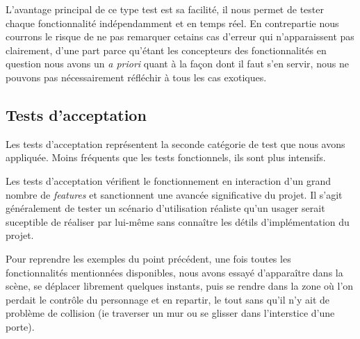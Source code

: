 L'avantage principal de ce type test est sa facilité, il nous permet de tester chaque fonctionnalité indépendamment et en temps réel. En contrepartie nous courrons le risque de ne pas remarquer cetains cas d'erreur qui n'apparaissent pas clairement, d'une part parce qu'étant les concepteurs des fonctionnalités en question nous avons un \textit{a priori} quant à la façon dont il faut s'en servir, nous ne pouvons pas nécessairement réfléchir à tous les cas exotiques.

\subsection{Tests d'acceptation}
Les tests d'acceptation représentent la seconde catégorie de test que nous avons appliquée. Moins fréquents que les tests fonctionnels, ils sont plus intensifs. \newline

Les tests d'acceptation vérifient le fonctionnement en interaction d'un grand nombre de \textit{features} et sanctionnent une avancée significative du projet. Il s'agit généralement de tester un scénario d'utilisation réaliste qu'un usager serait suceptible de réaliser par lui-même sans connaître les détils d'implémentation du projet. \newline

Pour reprendre les exemples du point précédent, une fois toutes les fonctionnalités mentionnées disponibles, nous avons essayé d'apparaître dans la scène, se déplacer librement quelques instants, puis se rendre dans la zone où l'on perdait le contrôle du personnage et en repartir, le tout sans qu'il n'y ait de problème de collision (ie traverser un mur ou se glisser dans l'interstice d'une porte). 
